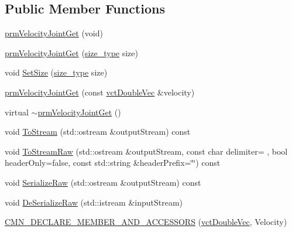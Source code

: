 \subsection*{Public Member Functions}
\begin{DoxyCompactItemize}
\item 
\hyperlink{classprm_velocity_joint_get_aadaa15924d96f4554b4c56c217a40ab9}{prm\+Velocity\+Joint\+Get} (void)
\item 
\hyperlink{classprm_velocity_joint_get_a69b1b5351d0ab6165b0409acbc32f6ff}{prm\+Velocity\+Joint\+Get} (\hyperlink{classprm_velocity_joint_get_af8a1c509111e5ac2e38dfe32bc6d9914}{size\+\_\+type} size)
\item 
void \hyperlink{classprm_velocity_joint_get_a7b006c7b4877bc284ebeed3dede08165}{Set\+Size} (\hyperlink{classprm_velocity_joint_get_af8a1c509111e5ac2e38dfe32bc6d9914}{size\+\_\+type} size)
\item 
\hyperlink{classprm_velocity_joint_get_a78a442376fb1f0dcd131ef37a11401b7}{prm\+Velocity\+Joint\+Get} (const \hyperlink{vct_dynamic_vector_types_8h_ade4b3068c86fb88f41af2e5187e491c2}{vct\+Double\+Vec} \&velocity)
\item 
virtual \hyperlink{classprm_velocity_joint_get_a6e07f92c33daf27a7c5e70a179cc94ba}{$\sim$prm\+Velocity\+Joint\+Get} ()
\item 
void \hyperlink{classprm_velocity_joint_get_ad6b47ae25d5023f1b388dc3b5ee7e5c4}{To\+Stream} (std\+::ostream \&output\+Stream) const 
\item 
void \hyperlink{classprm_velocity_joint_get_aa30c7cd787323214de8f7b1775af95d8}{To\+Stream\+Raw} (std\+::ostream \&output\+Stream, const char delimiter= \textquotesingle{} \textquotesingle{}, bool header\+Only=false, const std\+::string \&header\+Prefix=\char`\"{}\char`\"{}) const 
\item 
void \hyperlink{classprm_velocity_joint_get_a12a777066c57f49dcbfbe4ae6c4ccf33}{Serialize\+Raw} (std\+::ostream \&output\+Stream) const 
\item 
void \hyperlink{classprm_velocity_joint_get_a8a6a0f5889b11870aa79a8c6e375de67}{De\+Serialize\+Raw} (std\+::istream \&input\+Stream)
\end{DoxyCompactItemize}
{\bf }\par
\begin{DoxyCompactItemize}
\item 
\hyperlink{classprm_velocity_joint_get_a83e512377e6dc7aeb167e57d87429f72}{C\+M\+N\+\_\+\+D\+E\+C\+L\+A\+R\+E\+\_\+\+M\+E\+M\+B\+E\+R\+\_\+\+A\+N\+D\+\_\+\+A\+C\+C\+E\+S\+S\+O\+R\+S} (\hyperlink{vct_dynamic_vector_types_8h_ade4b3068c86fb88f41af2e5187e491c2}{vct\+Double\+Vec}, Velocity)
\end{DoxyCompactItemize}



